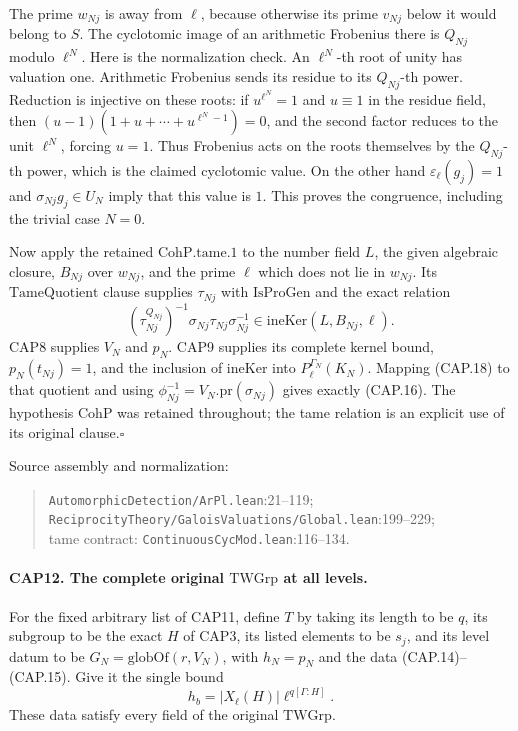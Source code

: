 The prime $w_{Nj}$ is away from $\ell$, because otherwise its prime
$v_{Nj}$ below it would belong to $S$.  The cyclotomic image of an
arithmetic Frobenius there is $Q_{Nj}$ modulo $\ell^N$.
Here is the normalization check.  An $\ell^N$-th root of unity has
valuation one.  Arithmetic Frobenius sends its residue to its
$Q_{Nj}$-th power.  Reduction is injective on these roots: if
$u^{\ell^N}=1$ and $u\equiv1$ in the residue field, then
$(u-1)(1+u+\cdots+u^{\ell^N-1})=0$, and the second factor reduces
to the unit $\ell^N$, forcing $u=1$.  Thus Frobenius acts on the
roots themselves by the $Q_{Nj}$-th power, which is the claimed
cyclotomic value.  On the other hand
$\varepsilon_\ell(g_j)=1$ and $\sigma_{Nj}g_j\in U_N$ imply that
this value is $1$.  This proves the congruence, including the trivial
case $N=0$.

Now apply the retained $\mathrm{CohP.tame.1}$ to the number field
$L$, the given algebraic closure, $B_{Nj}$ over $w_{Nj}$, and the
prime $\ell$ which does not lie in $w_{Nj}$.  Its
$\mathrm{TameQuotient}$ clause supplies
$\tau_{Nj}$ with $\mathrm{IsProGen}$ and the exact relation
\[
 (\tau_{Nj}^{Q_{Nj}})^{-1}
   \sigma_{Nj}\tau_{Nj}\sigma_{Nj}^{-1}
       \in\mathrm{ineKer}(L,B_{Nj},\ell).
 \tag{CAP.18}
\]
CAP8 supplies $V_N$ and $p_N$.  CAP9 supplies its complete kernel
bound, $p_N(t_{Nj})=1$, and the inclusion of $\mathrm{ineKer}$ into
$P_\ell^{\Gamma_N}(K_N)$.  Mapping (CAP.18) to that quotient and
using $\phi_{Nj}^{-1}=V_N.\mathrm{pr}(\sigma_{Nj})$ gives exactly
(CAP.16).  The hypothesis $\mathrm{CohP}$ was retained throughout;
the tame relation is an explicit use of its original clause.\hfill$\square$

Source assembly and normalization:
\begin{quote}\small
\nolinkurl{AutomorphicDetection/ArPl.lean}:21--119;\\
\nolinkurl{ReciprocityTheory/GaloisValuations/Global.lean}:199--229;\\
tame contract: \nolinkurl{ContinuousCycMod.lean}:116--134.
\end{quote}

\paragraph{CAP12. The complete original $\mathrm{TWGrp}$ at all levels.}
\label{claim:CAP12}
For the fixed arbitrary list of CAP11, define $T$ by taking its
length to be $q$, its subgroup to be the exact $H$ of CAP3, its
listed elements to be $s_j$, and its level datum to be
$G_N=\mathrm{globOf}(r,V_N)$, with $h_N=p_N$ and the data
(CAP.14)--(CAP.15).  Give it the single bound
\[
 h_b=|X_\ell(H)|\ell^{q[\Gamma:H]}.
 \tag{CAP.19}
\]
These data satisfy every field of the original $\mathrm{TWGrp}$.

